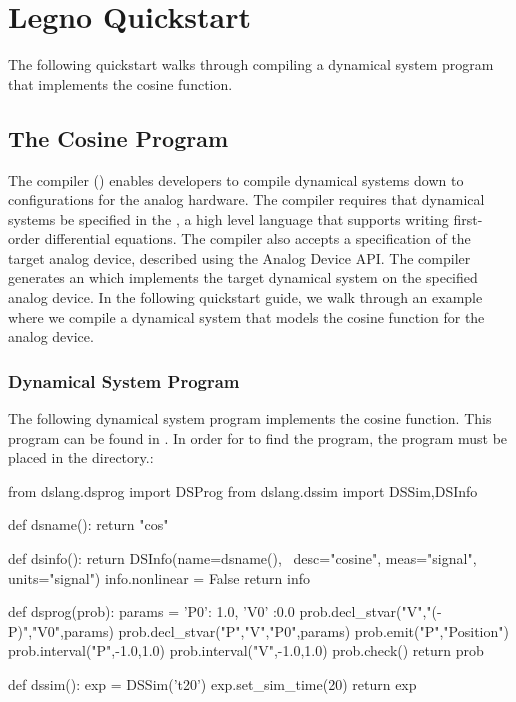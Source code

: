 \chapter{Legno Quickstart}

The following quickstart walks through compiling a dynamical system program that
implements the cosine function.


\section{The Cosine Program}

The \legno compiler () enables developers to compile dynamical
systems down to configurations for the analog hardware. The \legno compiler
requires that dynamical systems be specified in the , a high level language that supports writing first-order
differential equations. The \legno compiler also accepts a specification of the
target analog device, described using the Analog Device API. The \legno compiler
generates an  which implements the target dynamical
system on the specified analog device. In the following quickstart guide, we
walk through an example where we compile a dynamical system that models the
cosine function for the \hcdc analog device. 

\subsection{Dynamical System Program}
The following dynamical system program implements the cosine function. This
program can be found in . In order for 
to find the program, the program must be placed in the  directory.:
\begin{dssnippet}

from dslang.dsprog import DSProg
from dslang.dssim import DSSim,DSInfo

def dsname():
  return "cos"

def dsinfo():
  return DSInfo(name=dsname(), \
                desc="cosine",
                meas="signal",
                units="signal")
  info.nonlinear = False
  return info

def dsprog(prob):
  params = {
    'P0': 1.0,
    'V0' :0.0
  }
  prob.decl_stvar("V","(-P)","{V0}",params)
  prob.decl_stvar("P","V","{P0}",params)
  prob.emit("P","Position")
  prob.interval("P",-1.0,1.0)
  prob.interval("V",-1.0,1.0)
  prob.check()
  return prob

def dssim():
  exp = DSSim('t20')
  exp.set_sim_time(20)
  return exp
  
\end{dssnippet}

